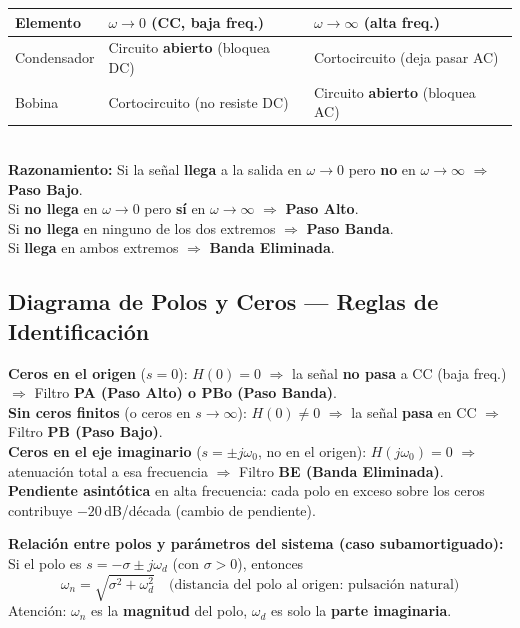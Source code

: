 \documentclass[12pt,a4paper]{article}
\begin{document}
\begin{formulabox}
\renewcommand{\arraystretch}{1.5}
\begin{tabular}{lll}
\toprule
\textbf{Elemento} & $\omega \to 0$ \;(CC, baja freq.) & $\omega \to \infty$ (alta freq.)\\
\midrule
Condensador & Circuito \textbf{abierto} (bloquea DC) & Cortocircuito (deja pasar AC)\\
Bobina      & Cortocircuito (no resiste DC) & Circuito \textbf{abierto} (bloquea AC)\\
\bottomrule
\end{tabular}\\[8pt]
\textbf{Razonamiento:} Si la señal \textbf{llega} a la salida en $\omega\to 0$ pero \textbf{no} en
$\omega\to\infty$ $\Rightarrow$ \textbf{Paso Bajo}.\\
Si \textbf{no llega} en $\omega\to 0$ pero \textbf{sí} en
$\omega\to\infty$ $\Rightarrow$ \textbf{Paso Alto}.\\
Si \textbf{no llega} en ninguno de los dos extremos $\Rightarrow$ \textbf{Paso Banda}.\\
Si \textbf{llega} en ambos extremos $\Rightarrow$ \textbf{Banda Eliminada}.
\end{formulabox}
\clearpage %
\subsection{Diagrama de Polos y Ceros — Reglas de Identificación}

\begin{formulabox}
\textbf{Ceros en el origen} ($s = 0$): $H(0) = 0$ $\Rightarrow$ la señal \textbf{no
pasa} a CC (baja freq.) $\Rightarrow$ Filtro \textbf{PA (Paso Alto) o PBo (Paso Banda)}.\\[4pt]
\textbf{Sin ceros finitos} (o ceros en $s\to\infty$): $H(0) \neq 0$ $\Rightarrow$
la señal \textbf{pasa} en CC $\Rightarrow$ Filtro \textbf{PB (Paso Bajo)}.\\[4pt]
\textbf{Ceros en el eje imaginario} ($s = \pm j\omega_0$, no en el origen):
$H(j\omega_0) = 0$ $\Rightarrow$ atenuación total a esa frecuencia $\Rightarrow$
Filtro \textbf{BE (Banda Eliminada)}.\\[4pt]
\textbf{Pendiente asintótica} en alta frecuencia: cada polo en exceso sobre los ceros
contribuye $-20$\,dB/década (cambio de pendiente).
\end{formulabox}

\medskip
\textbf{Relación entre polos y parámetros del sistema (caso subamortiguado):}
Si el polo es $s = -\sigma \pm j\omega_d$ (con $\sigma > 0$), entonces
\[
  \omega_n = \sqrt{\sigma^2 + \omega_d^2} \quad\text{(distancia del polo al origen: pulsación natural)}
\]
Atención: $\omega_n$ es la \textbf{magnitud} del polo, $\omega_d$ es solo la \textbf{parte imaginaria}.
\end{document}
